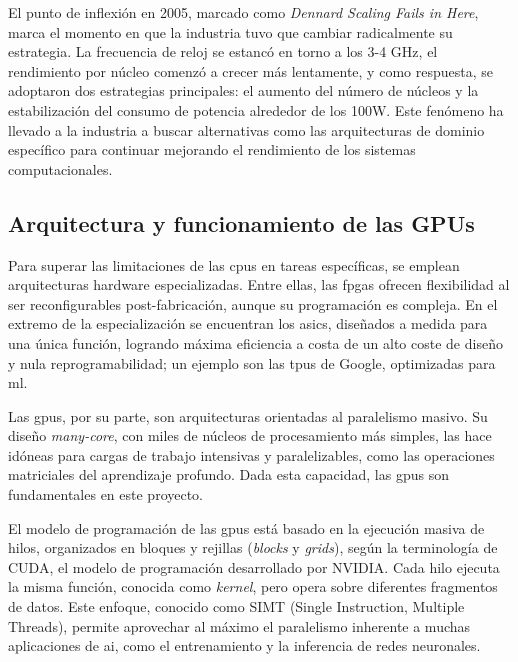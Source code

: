 \documentclass[11pt,spanish,listoffigures,listoftables]{tfgetsinf}
\begin{document}
El punto de inflexión en 2005, marcado como \textit{Dennard Scaling Fails in Here}, marca el momento en que la industria tuvo que cambiar radicalmente su estrategia. La frecuencia de reloj se estancó en torno a los 3-4 GHz, el rendimiento por núcleo comenzó a crecer más lentamente, y como respuesta, se adoptaron dos estrategias principales: el aumento del número de núcleos y la estabilización del consumo de potencia alrededor de los 100W. Este fenómeno ha llevado a la industria a buscar alternativas como las arquitecturas de dominio específico para continuar mejorando el rendimiento de los sistemas computacionales.

\subsection{Arquitectura y funcionamiento de las GPUs} \label{sec:arquitectura_gpus}

Para superar las limitaciones de las \glspl{cpu} en tareas específicas, se emplean arquitecturas hardware especializadas. Entre ellas, las \glspl{fpga} ofrecen flexibilidad al ser reconfigurables post-fabricación, aunque su programación es compleja. En el extremo de la especialización se encuentran los \glspl{asic}, diseñados a medida para una única función, logrando máxima eficiencia a costa de un alto coste de diseño y nula reprogramabilidad; un ejemplo son las \glspl{tpu} de Google, optimizadas para \gls{ml}.

Las \glspl{gpu}, por su parte, son arquitecturas orientadas al paralelismo masivo. Su diseño \textit{many-core}, con miles de núcleos de procesamiento más simples, las hace idóneas para cargas de trabajo intensivas y paralelizables, como las operaciones matriciales del aprendizaje profundo. Dada esta capacidad, las \glspl{gpu} son fundamentales en este proyecto.

El modelo de programación de las \glspl{gpu} está basado en la ejecución masiva de hilos, organizados en bloques y rejillas (\textit{blocks} y \textit{grids}), según la terminología de CUDA, el modelo de programación desarrollado por NVIDIA. Cada hilo ejecuta la misma función, conocida como \textit{kernel}, pero opera sobre diferentes fragmentos de datos. Este enfoque, conocido como SIMT (Single Instruction, Multiple Threads), permite aprovechar al máximo el paralelismo inherente a muchas aplicaciones de \gls{ai}, como el entrenamiento y la inferencia de redes neuronales.
\end{document}
